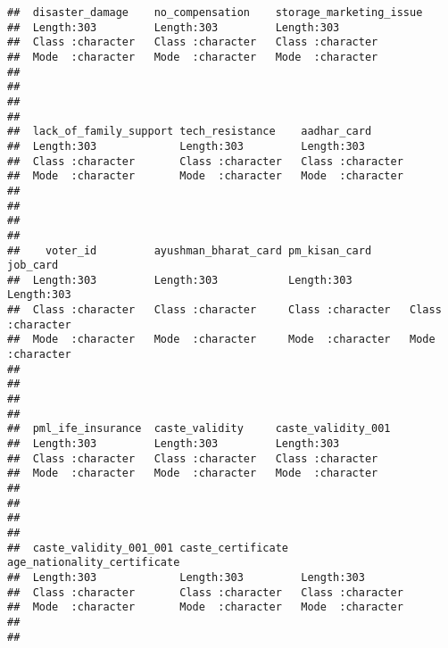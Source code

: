 \documentclass[
]{article}
\begin{document}
\begin{verbatim}
##  disaster_damage    no_compensation    storage_marketing_issue
##  Length:303         Length:303         Length:303             
##  Class :character   Class :character   Class :character       
##  Mode  :character   Mode  :character   Mode  :character       
##                                                               
##                                                               
##                                                               
##                                                               
##  lack_of_family_support tech_resistance    aadhar_card       
##  Length:303             Length:303         Length:303        
##  Class :character       Class :character   Class :character  
##  Mode  :character       Mode  :character   Mode  :character  
##                                                              
##                                                              
##                                                              
##                                                              
##    voter_id         ayushman_bharat_card pm_kisan_card        job_card        
##  Length:303         Length:303           Length:303         Length:303        
##  Class :character   Class :character     Class :character   Class :character  
##  Mode  :character   Mode  :character     Mode  :character   Mode  :character  
##                                                                               
##                                                                               
##                                                                               
##                                                                               
##  pml_ife_insurance  caste_validity     caste_validity_001
##  Length:303         Length:303         Length:303        
##  Class :character   Class :character   Class :character  
##  Mode  :character   Mode  :character   Mode  :character  
##                                                          
##                                                          
##                                                          
##                                                          
##  caste_validity_001_001 caste_certificate  age_nationality_certificate
##  Length:303             Length:303         Length:303                 
##  Class :character       Class :character   Class :character           
##  Mode  :character       Mode  :character   Mode  :character           
##                                                                       
##                                                                       

\end{verbatim}
\end{document}
